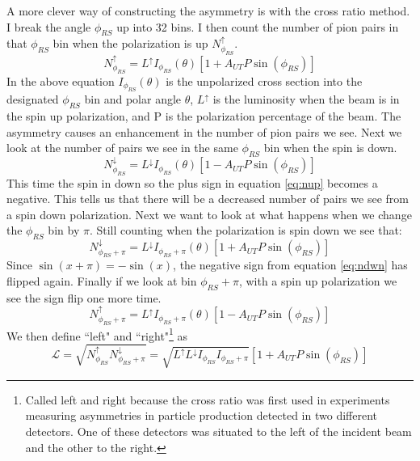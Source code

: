 \documentclass[abstract = on,listof=totoc, bibliography=totoc]{scrreprt}
\begin{document}
A more clever way of constructing the asymmetry is with the cross ratio method\cite{crossRatio}. I break the angle $\phi_{RS}$ up into 32 bins. I then count the number of pion pairs in that $\phi_{RS}$ bin when the polarization is up $N^\uparrow_{\phi_{RS}}$. 
\begin{equation}
\label{eq:nup}
N^\uparrow_{\phi_{RS}} = L^\uparrow I_{\phi_{RS}}(\theta)\left[1+A_{UT}P\sin(\phi_{RS})\right]
\end{equation}
In the above equation $I_{\phi_{RS}}(\theta)$ is the unpolarized cross section into the designated $\phi_{RS}$ bin and polar angle $\theta$, $L^\uparrow$ is the luminosity when the beam is in the spin up polarization, and P is the polarization percentage of the beam. The asymmetry causes an enhancement in the number of pion pairs we see. Next we look at the number of pairs we see in the same $\phi_{RS}$ bin when the spin is down.
\begin{equation}
\label{eq:ndwn}
N^\downarrow_{\phi_{RS}} = L^\downarrow I_{\phi_{RS}}(\theta)\left[1-A_{UT}P\sin(\phi_{RS})\right]
\end{equation}
This time the spin in down so the plus sign in equation \ref{eq:nup} becomes a negative. This tells us that there will be a decreased number of pairs we see from a spin down polarization. 
Next we want to look at what happens when we change the $\phi_{RS}$ bin by $\pi$. Still counting when the polarization is spin down we see that:
\begin{equation}
N^\downarrow_{\phi_{RS}+\pi} = L^\downarrow I_{\phi_{RS}+\pi}(\theta)\left[1+A_{UT}P\sin(\phi_{RS})\right]
\end{equation}
Since $\sin(x+\pi) = -\sin(x)$, the negative sign from equation \ref{eq:ndwn} has flipped again. Finally if we look at bin $\phi_{RS} + \pi$, with a spin up polarization we see the sign flip one more time. 
\begin{equation}
N^\uparrow_{\phi_{RS}+\pi} = L^\uparrow I_{\phi_{RS}+\pi}(\theta)\left[1-A_{UT}P\sin(\phi_{RS})\right]
\end{equation}
We then define ``left" and ``right"\footnote{Called left and right because the cross ratio was first used in experiments measuring asymmetries in particle production detected in two different detectors. One of these detectors was situated to the left of the incident beam and the other to the right.} as 
\begin{equation}
\mathcal{L} = \sqrt{N^\uparrow_{\phi_{RS}}N^\downarrow_{\phi_{RS}+\pi}}  = \sqrt{L^\uparrow L^\downarrow I_{\phi_{RS}} I_{\phi_{RS}+\pi}} \left[ 1+A_{UT}P\sin(\phi_{RS})\right]
\end{equation}
\end{document}
